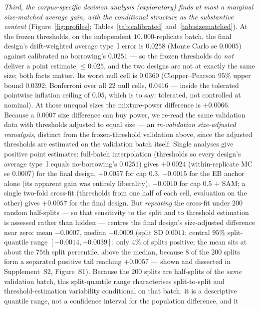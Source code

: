 \documentclass[11pt]{article}
\begin{document}
\emph{Third, the corpus-specific decision analysis (exploratory) finds at
most a marginal size-matched average gain, with the conditional structure
as the substantive content} (Figure~\ref{fig:profiles};
Tables~\ref{tab:calibrated} and~\ref{tab:sizematched}). At the frozen
thresholds, on the independent $10{,}000$-replicate batch, the final
design's drift-weighted average type~I error is $0.0258$ (Monte Carlo se
$0.0005$) against calibrated no borrowing's $0.0251$ --- so the frozen
thresholds do \emph{not} deliver a point estimate $\le 0.025$, and the two
designs are not at exactly the same size; both facts matter. Its worst
null cell is $0.0360$ (Clopper--Pearson $95\%$ upper bound $0.0392$;
Bonferroni over all $22$ null cells, $0.0416$ --- inside the tolerated
pointwise inflation ceiling of $0.05$, which is to say: tolerated, not
controlled at nominal). At those unequal sizes the mixture-power
difference is $+0.0066$. Because a $0.0007$ size difference can buy power,
we re-read the same validation data with thresholds adjusted to equal
size --- an \emph{in-validation size-adjusted reanalysis}, distinct from
the frozen-threshold validation above, since the adjusted thresholds are
estimated on the validation batch itself. Single analyses give positive
point estimates: full-batch interpolation (thresholds so every design's
average type~I equals no-borrowing's $0.0251$) gives $+0.0024$
(within-replicate MC se $0.0007$) for the final design, $+0.0057$ for cap
$0.3$, $-0.0015$ for the EB anchor alone (its apparent gain was entirely
liberality), $-0.0010$ for cap $0.5$ + SAM; a single two-fold cross-fit
(thresholds from one half of each cell, evaluation on the other) gives
$+0.0057$ for the final design. But \emph{repeating} the cross-fit under
$200$ random half-splits --- so that sensitivity to the split and to
threshold estimation is assessed rather than hidden --- centres the final
design's size-adjusted difference near zero: mean $-0.0007$, median
$-0.0009$ (split SD $0.0011$; central $95\%$ split-quantile range
$[-0.0014, +0.0039]$; only $4\%$ of splits positive; the mean sits at
about the $75$th split percentile, above the median, because $8$ of the
$200$ splits form a separated positive tail reaching $+0.0057$ --- shown
and dissected in Supplement~S2, Figure~S1). Because the $200$
splits are half-splits of the \emph{same} validation batch, this
split-quantile range characterises split-to-split and
threshold-estimation
variability conditional on that batch: it is a descriptive quantile
range, not a confidence interval for the population difference, and it
\end{document}
